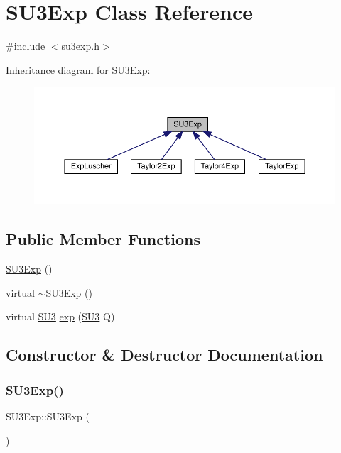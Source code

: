 \hypertarget{class_s_u3_exp}{}\section{S\+U3\+Exp Class Reference}
\label{class_s_u3_exp}


{\ttfamily \#include $<$su3exp.\+h$>$}



Inheritance diagram for S\+U3\+Exp\+:\nopagebreak
\begin{figure}[H]
\begin{center}
\leavevmode
\includegraphics[width=350pt]{class_s_u3_exp__inherit__graph}
\end{center}
\end{figure}
\subsection*{Public Member Functions}
\begin{DoxyCompactItemize}
\item 
\mbox{\hyperlink{class_s_u3_exp_a98afc0784d4b7fd89951ffa7d1209de6}{S\+U3\+Exp}} ()
\item 
virtual \mbox{\hyperlink{class_s_u3_exp_a68dc1c6cf615a08251d9976ca779b6ce}{$\sim$\+S\+U3\+Exp}} ()
\item 
virtual \mbox{\hyperlink{class_s_u3}{S\+U3}} \mbox{\hyperlink{class_s_u3_exp_a9760c17b9c3a4b6d0a5cd4d88c6d577e}{exp}} (\mbox{\hyperlink{class_s_u3}{S\+U3}} Q)
\end{DoxyCompactItemize}


\subsection{Constructor \& Destructor Documentation}
\mbox{\label{class_s_u3_exp_a98afc0784d4b7fd89951ffa7d1209de6}} 
\subsubsection{\texorpdfstring{SU3Exp()}{SU3Exp()}}
{\footnotesize\ttfamily S\+U3\+Exp\+::\+S\+U3\+Exp (\begin{DoxyParamCaption}{ }\end{DoxyParamCaption})}

